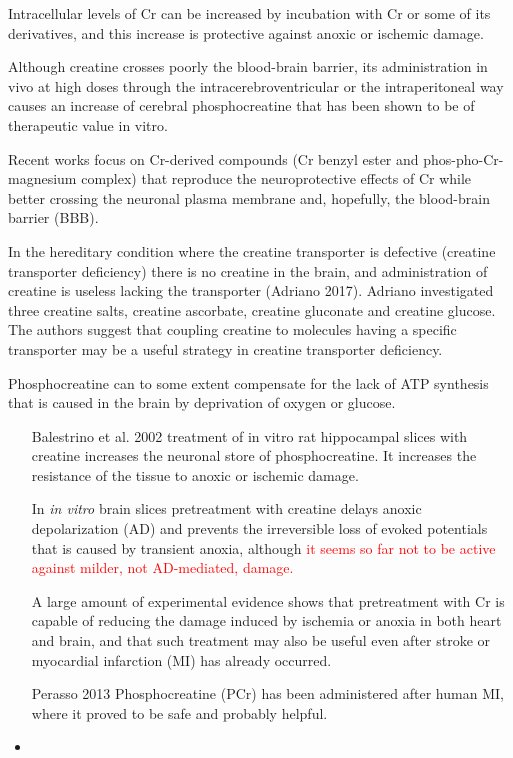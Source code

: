 \begin{mdframed}

Intracellular levels of Cr can be increased by incubation with Cr or some of its
derivatives, and this increase is protective against anoxic or ischemic damage.

Although creatine crosses poorly the blood-brain barrier, its administration in
vivo at high doses through the intracerebroventricular or the intraperitoneal
way causes an increase of cerebral phosphocreatine that has been shown to be of
therapeutic value in vitro.

Recent works focus on Cr-derived compounds (Cr benzyl ester and
phos-pho-Cr-magnesium complex) that reproduce the neuroprotective effects of Cr
while better crossing the neuronal plasma membrane and, hopefully, the
blood-brain barrier (BBB).

In the hereditary condition where the creatine transporter is defective
(creatine transporter deficiency) there is no creatine in the brain, and
administration of creatine is useless lacking the transporter (Adriano 2017).
Adriano investigated three creatine salts, creatine ascorbate, creatine
gluconate and creatine glucose. The authors suggest that coupling creatine to
molecules having a specific transporter may be a useful strategy in creatine
transporter deficiency.



\end{mdframed}


Phosphocreatine can to some extent compensate for the lack of ATP synthesis that
is caused in the brain by deprivation of oxygen or glucose.
\begin{itemize}
  \item  [Balestrino et al. 2002] treatment of in vitro rat hippocampal slices
  with creatine increases the neuronal store of phosphocreatine. It increases the resistance of the
  tissue to anoxic or ischemic damage.

In {\it in vitro} brain slices pretreatment with creatine delays anoxic
depolarization (AD) and prevents the irreversible loss of evoked potentials that
is caused by transient anoxia, although \textcolor{red}{it seems so far not to
be active against milder, not AD-mediated, damage.}

A large amount of experimental evidence shows that pretreatment with Cr is
capable of reducing the damage induced by ischemia or anoxia in both heart and
brain, and that such treatment may also be useful even after stroke or
myocardial infarction (MI) has already occurred.
  
   
  \item [Perasso 2013]  Phosphocreatine (PCr) has been administered after human
  MI, where it proved to be safe and probably helpful.
  
  
  \item 
\end{itemize}

